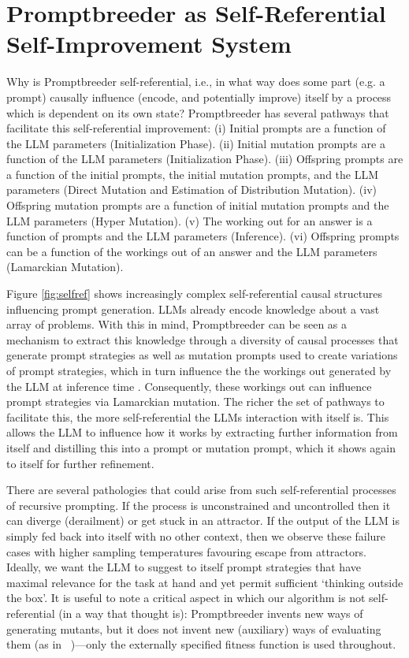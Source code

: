 \documentclass{article} %
\begin{document}
\section{Promptbreeder as Self-Referential Self-Improvement System}
\label{appendix:selfref}
Why is Promptbreeder self-referential, i.e., in what way does some part (e.g. a prompt) causally influence (encode, and potentially improve) itself by a process which is dependent on its own state? Promptbreeder has several pathways that facilitate this self-referential improvement: (i) Initial prompts are a function of the LLM parameters (Initialization Phase). (ii) Initial mutation prompts are a function of the LLM parameters (Initialization Phase). (iii) Offspring prompts are a function of the initial prompts, the initial mutation prompts, and the LLM parameters (Direct Mutation and Estimation of Distribution Mutation). (iv) Offspring mutation prompts are a function of initial mutation prompts and the LLM parameters (Hyper Mutation). (v) The working out for an answer is a function of prompts and the LLM parameters (Inference). (vi) Offspring prompts can be a function of the workings out of an answer and the LLM parameters (Lamarckian Mutation). 

Figure \ref{fig:selfref} shows increasingly complex self-referential causal structures influencing prompt generation. LLMs already encode knowledge about a vast array of problems. With this in mind, Promptbreeder can be seen as a mechanism to extract this knowledge through a diversity of causal processes that generate prompt strategies as well as mutation prompts used to create variations of prompt strategies, which in turn influence the the workings out generated by the LLM at inference time . Consequently, these workings out can influence prompt strategies via Lamarckian mutation. The richer the set of pathways to facilitate this, the more self-referential the LLMs interaction with itself is. This allows the LLM to influence how it works by extracting further information from itself and distilling this into a prompt or mutation prompt, which it shows again to itself for further refinement.

There are several pathologies that could arise from such self-referential processes of recursive prompting. If the process is unconstrained and uncontrolled then it can diverge (derailment) or get stuck in an attractor. If the output of the LLM is simply fed back into itself with no other context, then we observe these failure cases with higher sampling temperatures favouring escape from attractors. Ideally, we want the LLM to suggest to itself prompt strategies that have maximal relevance for the task at hand and yet permit sufficient `thinking outside the box'. It is useful to note a critical aspect in which our algorithm is not self-referential (in a way that thought is): Promptbreeder invents new ways of generating mutants, but it does not invent new (auxiliary) ways of evaluating them (as in ~\citet{DBLP:conf/iclr/JaderbergMCSLSK17})---only the externally specified fitness function is used throughout. 
\end{document}
